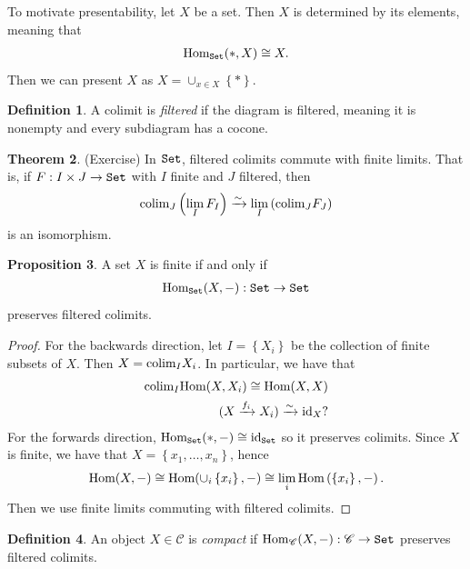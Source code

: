 \documentclass[12pt]{amsart}
\theoremstyle{definition}
\newtheorem{theorem}{Theorem}[section]
\newtheorem{definition}[theorem]{Definition}
\newtheorem{proposition}[theorem]{Proposition}
\begin{document}
To motivate presentability, let $X$ be a set. Then $X$ is determined by its elements, meaning that
\begin{align*}
    \text{Hom}_{\texttt{Set}}(\ast,X) \cong X.
\end{align*}
Then we can present $X$ as $X = \cup_{x\in X} \left\{ \ast \right\}$.

\begin{definition} A colimit is \textit{filtered} if the diagram is filtered, meaning it is nonempty and every subdiagram has a cocone.
\end{definition}

\begin{theorem} (Exercise) In $\texttt{Set}$, filtered colimits commute with finite limits. That is, if $F: I \times J \to \texttt{Set}$ with $I$ finite and $J$ filtered, then
\begin{align*}
    \text{colim}_J \left( \lim_I F_I \right) \xrightarrow{\sim} \lim_I \left( \text{colim}_J F_J \right)
\end{align*}
is an isomorphism.
\end{theorem}

\begin{proposition} A set $X$ is finite if and only if
\begin{align*}
    \text{Hom}_{\texttt{Set}}(X,-) : \texttt{Set} \to \texttt{Set}
\end{align*}
preserves filtered colimits.
\end{proposition}
\begin{proof} For the backwards direction, let $I = \left\{ X_i \right\}$ be the collection of finite subsets of $X$. Then $X = \text{colim}_I X_i$. In particular, we have that
\begin{align*}
    \text{colim}_I \text{Hom}(X,X_i) \cong \text{Hom}(X,X) \\
    (X \xrightarrow{f_i} X_i) \xrightarrow{\sim} \text{id}_X?
\end{align*}
For the forwards direction, $\text{Hom}_{\texttt{Set}}(\ast,-) \cong \text{id}_{\texttt{Set}}$ so it preserves colimits. Since $X$ is finite, we have that $X = \left\{ x_1, \ldots, x_n \right\}$, hence
\begin{align*}
    \text{Hom}(X,-) \cong \text{Hom}(\cup_i \left\{ x_i \right\},-) \cong \lim_i \text{Hom} \left( \left\{ x_i \right\},- \right).
\end{align*}
Then we use finite limits commuting with filtered colimits.
\end{proof}

\begin{definition} An object $X \in \mathscr{C}$ is \textit{compact} if $\text{Hom}_\mathscr{C}(X,-): \mathscr{C} \to \texttt{Set}$ preserves filtered colimits.
\end{definition}
\end{document}
